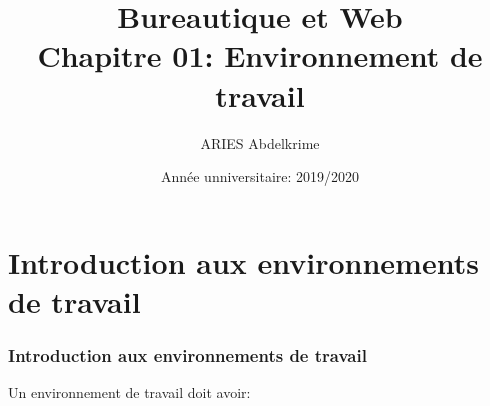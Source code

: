 \documentclass{beamer}
\title[BWEB: 01- Environnement] %
{Bureautique et Web \\Chapitre 01: Environnement de travail}
\institute{ %
École  nationale Supérieure d'Informatique (ESI, ex. INI), Algérie
}
\author[ \textbf{\footnotesize  \insertframenumber/\inserttotalframenumber} \hspace*{\fill} ESI (2019-2020)] %
{ARIES Abdelkrime}
\date{Année unniversitaire: 2019/2020} %
\begin{document}
\begin{frame}[plain]
	\maketitle
\end{frame}

\section{Introduction aux environnements de travail}

\begin{frame}
\frametitle{Introduction aux environnements de travail}

Un environnement de travail doit avoir:


\end{frame}
\end{document}
